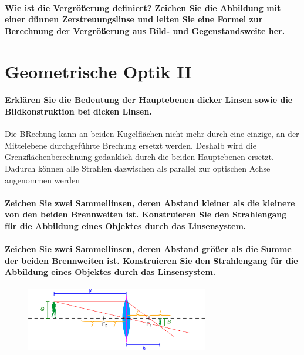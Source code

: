 \documentclass[a4paper, 11pt, parskip=half]{scrartcl}
\begin{document}
\paragraph{Wie ist die Vergrößerung definiert? Zeichen Sie die Abbildung mit einer dünnen
Zerstreuungslinse und leiten Sie eine Formel zur Berechnung der Vergrößerung aus Bild- und
Gegenstandsweite her.}

\newpage

\section{Geometrische Optik II}

\paragraph{Erklären Sie die Bedeutung der Hauptebenen dicker Linsen sowie die Bildkonstruktion bei
dicken Linsen.}

Die BRechung kann an beiden Kugelflächen nicht mehr durch eine einzige, an der Mittelebene durchgeführte Brechung ersetzt werden. Deshalb wird die Grenzflächenberechnung gedanklich durch die beiden Hauptebenen ersetzt. Dadurch können alle Strahlen dazwischen als parallel zur optischen Achse angenommen werden

\paragraph{Zeichen Sie zwei Sammellinsen, deren Abstand kleiner als die kleinere von den beiden
Brennweiten ist. Konstruieren Sie den Strahlengang für die Abbildung eines Objektes durch
das Linsensystem.}

\paragraph{Zeichen Sie zwei Sammellinsen, deren Abstand größer als die Summe der beiden
Brennweiten ist. Konstruieren Sie den Strahlengang für die Abbildung eines Objektes durch
das Linsensystem.}

\begin{figure}[H]
    \centering
    \includegraphics[width=8cm]{image/18/geo22}
\end{figure}
\end{document}
